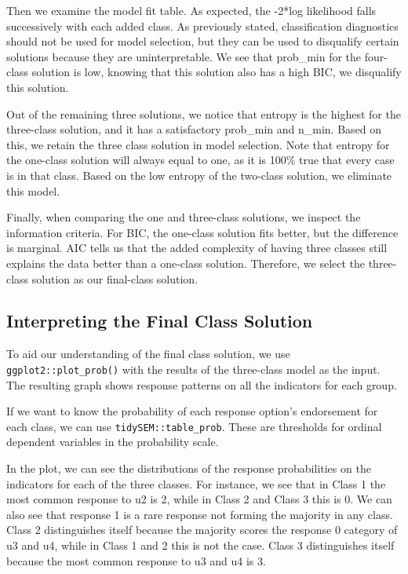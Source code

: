 \documentclass[
  ,man,floatsintext]{apa6}
\begin{document}
Then we examine the model fit table.
As expected, the -2*log likelihood falls successively with each added class.
As previously stated, classification diagnostics should not be used for model selection,
but they can be used to disqualify certain solutions because they are uninterpretable.
We see that prob\_min for the four-class solution is low,
knowing that this solution also has a high BIC, we disqualify this solution.

Out of the remaining three solutions,
we notice that entropy is the highest for the three-class solution,
and it has a satisfactory prob\_min and n\_min.
Based on this, we retain the three class solution in model selection.
Note that entropy for the one-class solution will always equal to one,
as it is 100\% true that every case is in that class.
Based on the low entropy of the two-class solution,
we eliminate this model.

Finally, when comparing the one and three-class solutions,
we inspect the information criteria.
For BIC, the one-class solution fits better, but the difference is marginal.
AIC tells us that the added complexity
of having three classes still explains the data better
than a one-class solution.
Therefore, we select the three-class solution as our final-class solution.

\hypertarget{interpreting-the-final-class-solution}{%
\subsection{Interpreting the Final Class Solution}\label{interpreting-the-final-class-solution}}

To aid our understanding of the final class solution,
we use \texttt{ggplot2::plot\_prob()}
with the results of the three-class model as the input.
The resulting graph shows response patterns
on all the indicators for each group.

If we want to know the probability of each response option's endorsement
for each class, we can use \texttt{tidySEM::table\_prob}.
These are thresholds for ordinal dependent variables in the probability scale.

In the plot, we can see the distributions of the response probabilities on the indicators
for each of the three classes.
For instance, we see that in Class 1 the most common response to u2 is 2,
while in Class 2 and Class 3 this is 0.
We can also see that response 1 is a rare response not forming the majority in
any class.
Class 2 distinguishes itself because the majority scores the response 0 category of u3 and u4,
while in Class 1 and 2 this is not the case.
Class 3 distinguishes itself because the most common response to u3 and u4 is 3.
\end{document}
